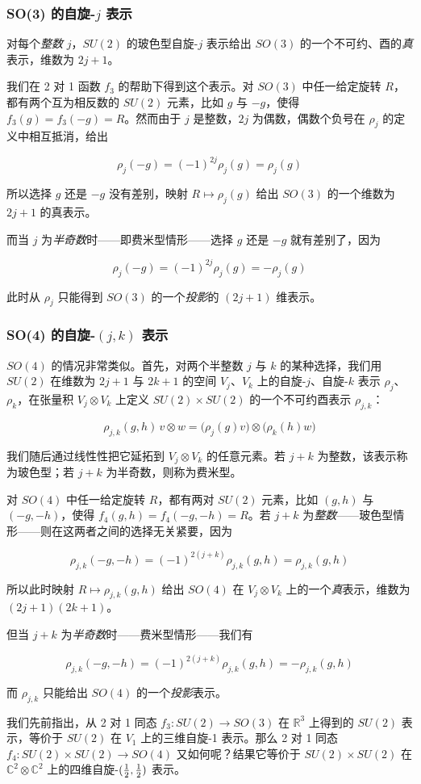 \subsubsection{SO(3) 的自旋-$j$ 表示}

对每个\emph{整数} $j$，$SU(2)$ 的玻色型自旋-$j$ 表示给出 $SO(3)$ 的一个不可约、酉的\emph{真}表示，维数为 $2j+1$。

我们在 2 对 1 函数 $f_{3}$ 的帮助下得到这个表示。对 $SO(3)$ 中任一给定旋转 $R$，都有两个互为相反数的 $SU(2)$ 元素，比如 $g$ 与 $-g$，使得 $f_{3}(g)=f_{3}(-g)=R$。然而由于 $j$ 是整数，$2j$ 为偶数，偶数个负号在 $\rho_{j}$ 的定义中相互抵消，给出

\[
\rho_{j}(-g)=(-1)^{2j}\rho_{j}(g)=\rho_{j}(g)
\]

所以选择 $g$ 还是 $-g$ 没有差别，映射 $R\mapsto\rho_{j}(g)$ 给出 $SO(3)$ 的一个维数为 $2j+1$ 的真表示。

而当 $j$ 为\emph{半奇数}时——即费米型情形——选择 $g$ 还是 $-g$ 就有差别了，因为

\[
\rho_{j}(-g)=(-1)^{2j}\rho_{j}(g)=-\rho_{j}(g)
\]

此时从 $\rho_{j}$ 只能得到 $SO(3)$ 的一个\emph{投影}的 $(2j+1)$ 维表示。

\subsubsection{SO(4) 的自旋-$(j,k)$ 表示}

$SO(4)$ 的情况非常类似。首先，对两个半整数 $j$ 与 $k$ 的某种选择，我们用 $SU(2)$ 在维数为 $2j+1$ 与 $2k+1$ 的空间 $V_{j}$、$V_{k}$ 上的自旋-$j$、自旋-$k$ 表示 $\rho_{j}$、$\rho_{k}$，在张量积 $V_{j}\otimes V_{k}$ 上定义 $SU(2)\times SU(2)$ 的一个不可约酉表示 $\rho_{j,k}$：

\[
\rho_{j,k}(g,h)\,v\otimes w=\bigl(\rho_{j}(g)v\bigr)\otimes\bigl(\rho_{k}(h)w\bigr)
\]

我们随后通过线性性把它延拓到 $V_{j}\otimes V_{k}$ 的任意元素。若 $j+k$ 为整数，该表示称为玻色型；若 $j+k$ 为半奇数，则称为费米型。

对 $SO(4)$ 中任一给定旋转 $R$，都有两对 $SU(2)$ 元素，比如 $(g,h)$ 与 $(-g,-h)$，使得 $f_{4}(g,h)=f_{4}(-g,-h)=R$。若 $j+k$ 为\emph{整数}——玻色型情形——则在这两者之间的选择无关紧要，因为

\[
\rho_{j,k}(-g,-h)=(-1)^{2(j+k)}\rho_{j,k}(g,h)=\rho_{j,k}(g,h)
\]

所以此时映射 $R\mapsto\rho_{j,k}(g,h)$ 给出 $SO(4)$ 在 $V_{j}\otimes V_{k}$ 上的一个\emph{真}表示，维数为 $(2j+1)(2k+1)$。

但当 $j+k$ 为\emph{半奇数}时——费米型情形——我们有

\[
\rho_{j,k}(-g,-h)=(-1)^{2(j+k)}\rho_{j,k}(g,h)=-\rho_{j,k}(g,h)
\]

而 $\rho_{j,k}$ 只能给出 $SO(4)$ 的一个\emph{投影}表示。

我们先前指出，从 2 对 1 同态 $f_{3}:SU(2)\to SO(3)$ 在 $\mathbb{R}^{3}$ 上得到的 $SU(2)$ 表示，等价于 $SU(2)$ 在 $V_{1}$ 上的三维自旋-1 表示。那么 2 对 1 同态 $f_{4}:SU(2)\times SU(2)\to SO(4)$ 又如何呢？结果它等价于 $SU(2)\times SU(2)$ 在 $\mathbb{C}^{2}\otimes\mathbb{C}^{2}$ 上的四维自旋-$(\tfrac{1}{2},\tfrac{1}{2})$ 表示。
